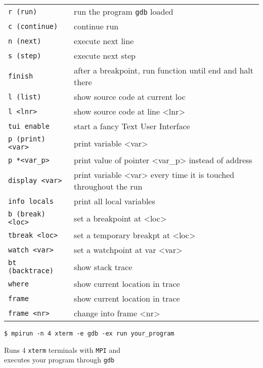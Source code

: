 \documentclass[10pt, a4paper, english, parskip, twocolumn]{scrartcl}
\newcommand{\code}[1]{\texttt{#1}}
\newcommand{\gdbsection}[1]{\begin{mdframed}[frametitlebackgroundcolor=bittersweet,style=section,
frametitle=#1]\end{mdframed}}
\begin{document}
\gdbsection{gdb basic commands}
%
{\renewcommand{\arraystretch}{1.15}%
\begin{table}[H]
\begin{center}
\begin{tabular}{p{2.8cm}p{5.4cm}}
\code{r (run)}          & run the program \code{gdb} loaded \\
\code{c (continue)}     & continue run\\
\code{n (next)}         & execute next line\\
\code{s (step)}         & execute next step\\
\code{finish}           & after a breakpoint, run function until end and halt there\\[1em]
%
\code{l (list)}         & show source code at current loc\\
\code{l <lnr>}          & show source code at line <lnr>\\
\code{tui enable}       & start a fancy Text User Interface\\[1em]
%
\code{p (print) <var>}  & print variable <var>\\
\code{p *<var\_p>}      & print value of pointer <var\_p> instead of address\\
\code{display <var>}    & print variable <var> every time it is touched throughout the run\\
\code{info locals}      & print all local variables\\[1em]
%
\code{b (break) <loc>}  & set a breakpoint at <loc>\\
\code{tbreak <loc>}     & set a temporary breakpt at <loc>\\
\code{watch <var>}      & set a watchpoint at var <var>\\[1em]
%
\code{bt (backtrace)}   & show stack trace\\
\code{where}            & show current location in trace\\
\code{frame}            & show current location in trace\\
\code{frame <nr>}       & change into frame <nr>
\end{tabular}
\end{center}
\end{table}
}







\gdbsection{gdb and MPI}

\begin{lstlisting}[belowskip=-0.8 \baselineskip]
$ mpirun -n 4 xterm -e gdb -ex run your_program
\end{lstlisting}
\quad\quad Runs 4 \code{xterm} terminals with \code{MPI} and\\
\quad\quad executes your program through \code{gdb}
\end{document}
